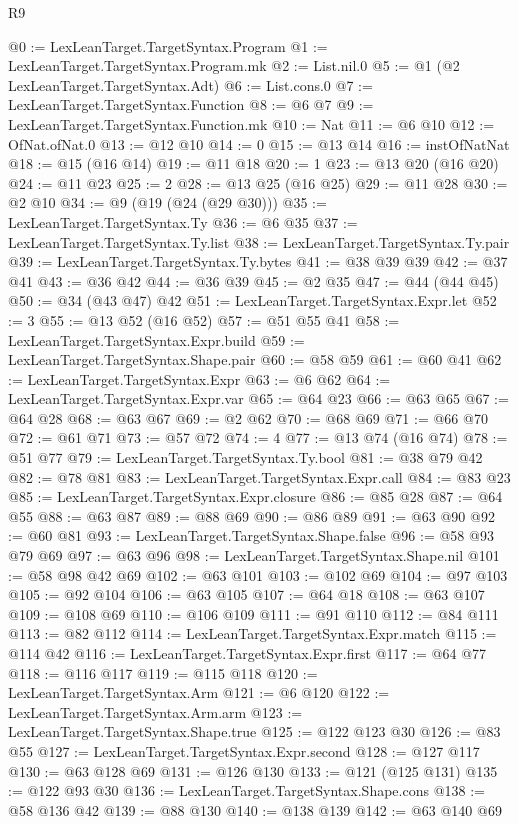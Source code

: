 \begin{lexlean}{R9}
\begin{coremodule}
{{{{{{{{{{{{{{{@0 := LexLeanTarget.TargetSyntax.Program
@1 := LexLeanTarget.TargetSyntax.Program.mk
@2 := List.nil.{0}
@5 := @1 (@2 LexLeanTarget.TargetSyntax.Adt)
@6 := List.cons.{0}
@7 := LexLeanTarget.TargetSyntax.Function
@8 := @6 @7
@9 := LexLeanTarget.TargetSyntax.Function.mk
@10 := Nat
@11 := @6 @10
@12 := OfNat.ofNat.{0}
@13 := @12 @10
@14 := 0
@15 := @13 @14
@16 := instOfNatNat
@18 := @15 (@16 @14)
@19 := @11 @18
@20 := 1
@23 := @13 @20 (@16 @20)
@24 := @11 @23
@25 := 2
@28 := @13 @25 (@16 @25)
@29 := @11 @28
@30 := @2 @10
@34 := @9 (@19 (@24 (@29 @30)))
@35 := LexLeanTarget.TargetSyntax.Ty
@36 := @6 @35
@37 := LexLeanTarget.TargetSyntax.Ty.list
@38 := LexLeanTarget.TargetSyntax.Ty.pair
@39 := LexLeanTarget.TargetSyntax.Ty.bytes
@41 := @38 @39 @39
@42 := @37 @41
@43 := @36 @42
@44 := @36 @39
@45 := @2 @35
@47 := @44 (@44 @45)
@50 := @34 (@43 @47) @42
@51 := LexLeanTarget.TargetSyntax.Expr.let
@52 := 3
@55 := @13 @52 (@16 @52)
@57 := @51 @55 @41
@58 := LexLeanTarget.TargetSyntax.Expr.build
@59 := LexLeanTarget.TargetSyntax.Shape.pair
@60 := @58 @59
@61 := @60 @41
@62 := LexLeanTarget.TargetSyntax.Expr
@63 := @6 @62
@64 := LexLeanTarget.TargetSyntax.Expr.var
@65 := @64 @23
@66 := @63 @65
@67 := @64 @28
@68 := @63 @67
@69 := @2 @62
@70 := @68 @69
@71 := @66 @70
@72 := @61 @71
@73 := @57 @72
@74 := 4
@77 := @13 @74 (@16 @74)
@78 := @51 @77
@79 := LexLeanTarget.TargetSyntax.Ty.bool
@81 := @38 @79 @42
@82 := @78 @81
@83 := LexLeanTarget.TargetSyntax.Expr.call
@84 := @83 @23
@85 := LexLeanTarget.TargetSyntax.Expr.closure
@86 := @85 @28
@87 := @64 @55
@88 := @63 @87
@89 := @88 @69
@90 := @86 @89
@91 := @63 @90
@92 := @60 @81
@93 := LexLeanTarget.TargetSyntax.Shape.false
@96 := @58 @93 @79 @69
@97 := @63 @96
@98 := LexLeanTarget.TargetSyntax.Shape.nil
@101 := @58 @98 @42 @69
@102 := @63 @101
@103 := @102 @69
@104 := @97 @103
@105 := @92 @104
@106 := @63 @105
@107 := @64 @18
@108 := @63 @107
@109 := @108 @69
@110 := @106 @109
@111 := @91 @110
@112 := @84 @111
@113 := @82 @112
@114 := LexLeanTarget.TargetSyntax.Expr.match
@115 := @114 @42
@116 := LexLeanTarget.TargetSyntax.Expr.first
@117 := @64 @77
@118 := @116 @117
@119 := @115 @118
@120 := LexLeanTarget.TargetSyntax.Arm
@121 := @6 @120
@122 := LexLeanTarget.TargetSyntax.Arm.arm
@123 := LexLeanTarget.TargetSyntax.Shape.true
@125 := @122 @123 @30
@126 := @83 @55
@127 := LexLeanTarget.TargetSyntax.Expr.second
@128 := @127 @117
@130 := @63 @128 @69
@131 := @126 @130
@133 := @121 (@125 @131)
@135 := @122 @93 @30
@136 := LexLeanTarget.TargetSyntax.Shape.cons
@138 := @58 @136 @42
@139 := @88 @130
@140 := @138 @139
@142 := @63 @140 @69
}}}}}}}}}}}}}}}
\end{coremodule}
\end{lexlean}
